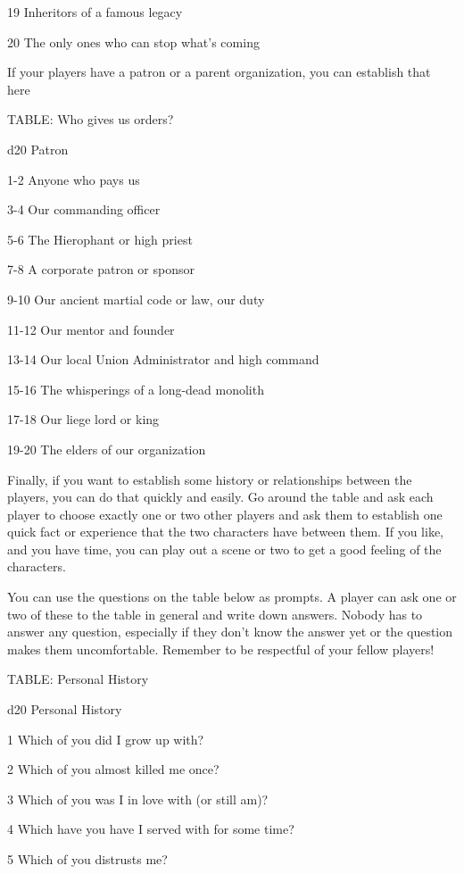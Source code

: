   19       Inheritors of a famous legacy

  20       The only ones who can stop what’s coming

If your players have a patron or a parent organization, you can establish that here

TABLE: Who gives us orders?


 d20       Patron

 1-2       Anyone who pays us

 3-4       Our commanding officer

 5-6       The Hierophant or high priest

 7-8       A corporate patron or sponsor

 9-10      Our ancient martial code or law, our duty

 11-12     Our mentor and founder

 13-14     Our local Union Administrator and high command

 15-16     The whisperings of a long-dead monolith

 17-18     Our liege lord or king

 19-20     The elders of our organization

Finally, if you want to establish some history or relationships between the players, you can do
that quickly and easily. Go around the table and ask each player to choose exactly one or two
other players and ask them to establish one quick fact or experience that the two characters
have between them. If you like, and you have time, you can play out a scene or two to get a
good feeling of the characters.

You can use the questions on the table below as prompts. A player can ask one or two of these
to the table in general and write down answers. Nobody has to answer any question, especially if
they don’t know the answer yet or the question makes them uncomfortable. Remember to be
respectful of your fellow players!

TABLE: Personal History

 d20       Personal	History

 1         Which of you did I grow up with?

 2         Which of you almost killed me once?

 3         Which of you was I in love with (or still am)?

 4         Which have you have I served with for some time?

 5         Which of you distrusts me?


